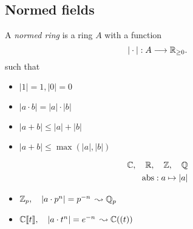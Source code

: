 \subsection{Normed fields} \label{sec:normed_fields}

\begin{frame}[fragile]
	\begin{minipage}[t]{.60\textwidth}
	\begin{definition}
		A \emph{normed ring} is a ring  $A$ with a function \[ 
			|\cdot |:A  \longrightarrow \mathbb R_{\ge 0}
		.\]
	such that 
	\begin{itemize}
		\item $|1| = 1, |0| = 0$
		\item $|a \cdot b| = |a | \cdot |b|$ 
		\item $|a + b| \le |a| + |b|$
	\end{itemize}

	\medskip

	\begin{itemize}
		\item<2-> $|a + b| \le \max(|a|, |b|)$
\end{itemize}
	\end{definition}
	\end{minipage}
	\;
	\begin{minipage}[t]{.35\textwidth}
		\begin{examples}
			\[
				\begin{aligned}
			\mathbb C,\quad \mathbb R,\quad \mathbb Z,\quad \mathbb Q\\
			\mathrm{abs}:a \mapsto |a|
				\end{aligned}
		\]

		\bigskip

		\begin{itemize}
				\item<2-> $\mathbb Z_p,\quad |a\cdot p^{n}| = p^{-n}$ $\leadsto \mathbb Q_p$
				\item<2-> $\mathbb C\llbracket t \rrbracket,\quad |a\cdot t ^{n}| = e^{-n}$ $\leadsto \mathbb C((t))$
		\end{itemize}	
	\end{examples}
	\end{minipage}
\end{frame}
